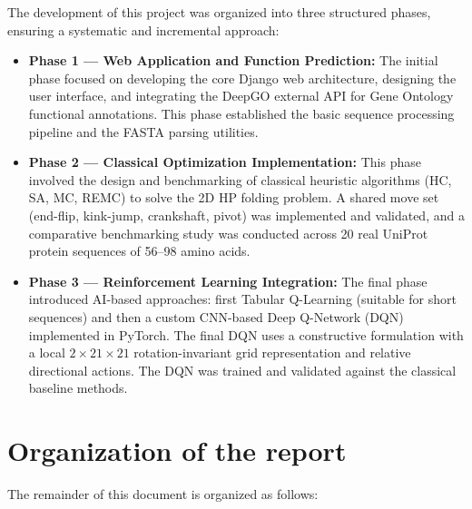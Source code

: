 The development of this project was organized into three structured phases, ensuring a systematic and incremental approach:

\begin{itemize}
    \item \textbf{Phase 1 --- Web Application and Function Prediction:} The initial phase focused on developing the core Django web architecture, designing the user interface, and integrating the DeepGO external API for Gene Ontology functional annotations. This phase established the basic sequence processing pipeline and the FASTA parsing utilities.

    \item \textbf{Phase 2 --- Classical Optimization Implementation:} This phase involved the design and benchmarking of classical heuristic algorithms (HC, SA, MC, REMC) to solve the 2D HP folding problem. A shared move set (end-flip, kink-jump, crankshaft, pivot) was implemented and validated, and a comparative benchmarking study was conducted across 20 real UniProt protein sequences of 56--98 amino acids.

    \item \textbf{Phase 3 --- Reinforcement Learning Integration:} The final phase introduced AI-based approaches: first Tabular Q-Learning (suitable for short sequences) and then a custom CNN-based Deep Q-Network (DQN) implemented in PyTorch. The final DQN uses a constructive formulation with a local $2 \times 21 \times 21$ rotation-invariant grid representation and relative directional actions. The DQN was trained and validated against the classical baseline methods.
\end{itemize}

\section{Organization of the report}
\label{intro:sec_organization}

The remainder of this document is organized as follows:

